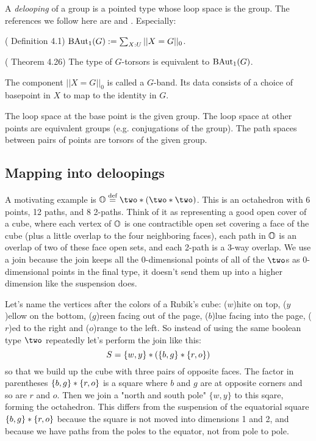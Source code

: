 \documentclass[12pt]{article}
\begin{document}
A \emph{delooping} of a group is a pointed type whose loop space is the group. The references we follow here are \cite{Symmetry} and \cite{buchholtz2023central}. Especially:

\begin{mydef}
 (\cite{buchholtz2023central} Definition 4.1) \( \mathrm{BAut}_1(G):=\sum_{X:U}||X=G||_0 \).
\end{mydef}

\begin{mythm}
(\cite{buchholtz2023central} Theorem 4.26) The type of \( G \)-torsors is equivalent to \( \mathrm{BAut}_1(G) \).
\end{mythm}

The component \( ||X=G||_0 \) is called a \( G \)-band. Its data consists of a choice of basepoint in \( X \) to map to the identity in \( G \).

The loop space at the base point is the given group. The loop space at other points are equivalent groups (e.g. conjugations of the group). The path spaces between pairs of points are torsors of the given group.

\subsection{Mapping into deloopings}

A motivating example is \( \oo\defeq\two\join(\two\join\two) \). This is an octahedron with 6 points, 12 paths, and 8 2-paths. Think of it as representing a good open cover of a cube, where each vertex of \( \mathbb{O} \) is one contractible open set covering a face of the cube (plus a little overlap to the four neighboring faces), each path in \( \mathbb{O} \) is an overlap of two of these face open sets, and each 2-path is a 3-way overlap. We use a join because the join keeps all the 0-dimensional points of all of the \( \two \)s as 0-dimensional points in the final type, it doesn't send them up into a higher dimension like the suspension does.

Let's name the vertices after the colors of a Rubik's cube: (\( w \))hite on top, (\( y \))ellow on the bottom, (\( g \))reen facing out of the page, (\( b \))lue facing into the page, (\( r \))ed to the right and (\( o \))range to the left. So instead of using the same boolean type \( \two \) repeatedly let's perform the join like this: 
\[ 
S=\{w, y\}* (\{b, g\}*\{r, o\}) 
\] so that we build up the cube with three pairs of opposite faces. The factor in parentheses \( \{b, g\}*\{r, o\} \) is a square where \( b \) and \( g \) are at opposite corners and so are \( r \) and \( o \). Then we join a "north and south pole" \( \{w, y\} \) to this sqare, forming the octahedron. This differs from the suspension of the equatorial square \( \{b, g\}*\{r, o\} \) because the square is not moved into dimensions 1 and 2, and because we have paths from the poles to the equator, not from pole to pole.
\end{document}
